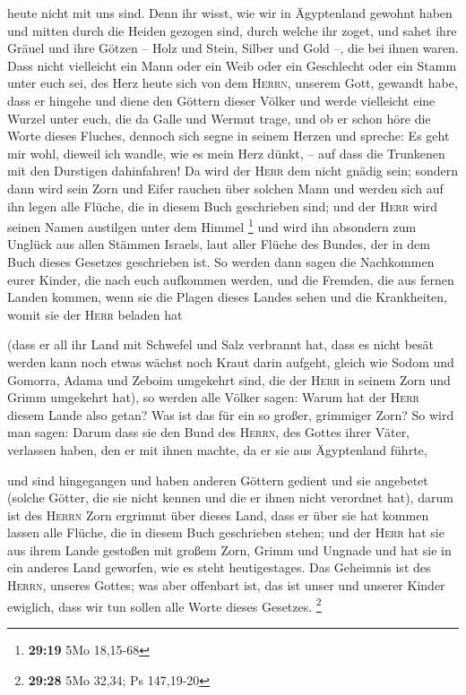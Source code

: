 heute nicht mit uns sind.  Denn ihr wisst, wie wir in
Ägyptenland gewohnt haben und mitten durch die Heiden gezogen sind,
durch welche ihr zoget,  und sahet ihre Gräuel und ihre
Götzen -- Holz und Stein, Silber und Gold --, die bei ihnen waren.
 Dass nicht vielleicht ein Mann oder ein Weib oder ein
Geschlecht oder ein Stamm unter euch sei, des Herz heute sich von dem
\textsc{Herrn}, unserem Gott, gewandt habe, dass er hingehe und diene
den Göttern dieser Völker und werde vielleicht eine Wurzel unter euch,
die da Galle und Wermut trage,  und ob er schon höre die
Worte dieses Fluches, dennoch sich segne in seinem Herzen und spreche:
Es geht mir wohl, dieweil ich wandle, wie es mein Herz dünkt, -- auf
dass die Trunkenen mit den Durstigen dahinfahren!  Da
wird der \textsc{Herr} dem nicht gnädig sein; sondern dann wird sein
Zorn und Eifer rauchen über solchen Mann und werden sich auf ihn legen
alle Flüche, die in diesem Buch geschrieben sind; und der \textsc{Herr}
wird seinen Namen austilgen unter dem Himmel \footnote{\textbf{29:19}
  5Mo 18,15-68}  und wird ihn absondern zum Unglück aus
allen Stämmen Israels, laut aller Flüche des Bundes, der in dem Buch
dieses Gesetzes geschrieben ist.  So werden dann sagen
die Nachkommen eurer Kinder, die nach euch aufkommen werden, und die
Fremden, die aus fernen Landen kommen, wenn sie die Plagen dieses Landes
sehen und die Krankheiten, womit sie der \textsc{Herr} beladen hat

 (dass er all ihr Land mit Schwefel und Salz verbrannt
hat, dass es nicht besät werden kann noch etwas wächst noch Kraut darin
aufgeht, gleich wie Sodom und Gomorra, Adama und Zeboim umgekehrt sind,
die der \textsc{Herr} in seinem Zorn und Grimm umgekehrt hat),
 so werden alle Völker sagen: Warum hat der \textsc{Herr}
diesem Lande also getan? Was ist das für ein so großer, grimmiger Zorn?
 So wird man sagen: Darum dass sie den Bund des
\textsc{Herrn}, des Gottes ihrer Väter, verlassen haben, den er mit
ihnen machte, da er sie aus Ägyptenland führte,

 und sind hingegangen und haben anderen Göttern gedient
und sie angebetet (solche Götter, die sie nicht kennen und die er ihnen
nicht verordnet hat),  darum ist des \textsc{Herrn} Zorn
ergrimmt über dieses Land, dass er über sie hat kommen lassen alle
Flüche, die in diesem Buch geschrieben stehen;  und der
\textsc{Herr} hat sie aus ihrem Lande gestoßen mit großem Zorn, Grimm
und Ungnade und hat sie in ein anderes Land geworfen, wie es steht
heutigestages.  Das Geheimnis ist des \textsc{Herrn},
unseres Gottes; was aber offenbart ist, das ist unser und unserer Kinder
ewiglich, dass wir tun sollen alle Worte dieses Gesetzes. \footnote{\textbf{29:28}
  5Mo 32,34; Ps 147,19-20}

